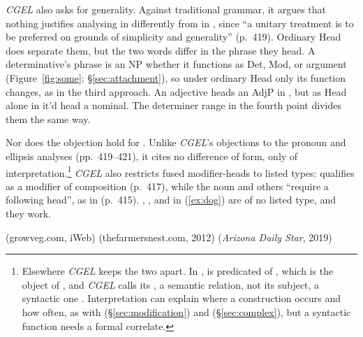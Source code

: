 \documentclass[12pt]{article}
\begin{document}
\textit{CGEL} also asks for generality. Against traditional grammar, it argues that nothing justifies analysing  in  differently from  in , since \enquote{a unitary treatment is to be preferred on grounds of simplicity and generality} (p.~419). Ordinary Head does separate them, but the two words differ in the phrase they head. A determinative's phrase is an NP whether it functions as Det, Mod, or argument (Figure~\ref{fig:some}; §\ref{sec:attachment}), so under ordinary Head only its function changes, as in the third approach. An adjective heads an AdjP in , but as Head alone in  it'd head a nominal. The determiner range in the fourth point divides them the same way.

Nor does the objection hold for . Unlike \textit{CGEL}'s objections to the pronoun and ellipsis analyses (pp.~419--421), it cites no difference of form, only of interpretation.\footnote{Elsewhere \textit{CGEL} keeps the two apart. In ,  is predicated of , which is the object of , and \textit{CGEL} calls  its , a semantic relation, not its subject, a syntactic one \citep[217, 252]{huddleston2002}. Interpretation can explain where a construction occurs and how often, as with  (§\ref{sec:modification}) and  (§\ref{sec:complex}), but a syntactic function needs a formal correlate.} \textit{CGEL} also restricts fused modifier-heads to listed types:  qualifies as a modifier of composition (p.~417), while the noun  and others \enquote{require a following head}, as in  (p.~415). , , and  in (\ref{ex:dog}) are of no listed type, and they work.

\ea\label{ex:dog}
\ea {}
\ex {}
\ex {}
\ex {}
\ex {} (growveg.com, iWeb)
\ex {} (thefarmersnest.com, 2012)
\ex {} (\textit{Arizona Daily Star}, 2019)
\z\z
\end{document}
